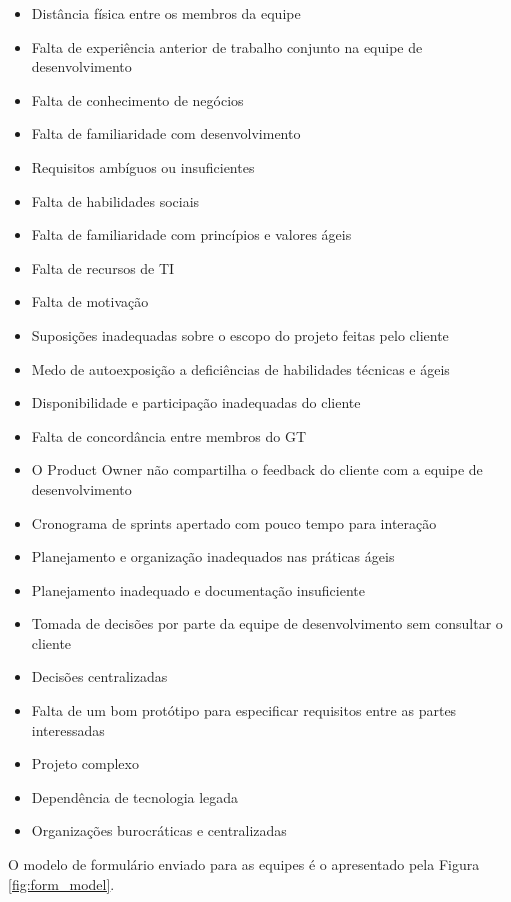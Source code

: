 \documentclass[
    12pt,       %
    openright,      %
    twoside,      %
    a4paper,      %
    english,      %
    french,       %
    spanish,      %
    brazil,       %
    ]{abntex2}
\begin{document}
\begin{itemize}
    \item Distância física entre os membros da equipe
    \item Falta de experiência anterior de trabalho conjunto na equipe de desenvolvimento
    \item Falta de conhecimento de negócios
    \item Falta de familiaridade com desenvolvimento
    \item Requisitos ambíguos ou insuficientes
    \item Falta de habilidades sociais
    \item Falta de familiaridade com princípios e valores ágeis
    \item Falta de recursos de TI
    \item Falta de motivação
    \item Suposições inadequadas sobre o escopo do projeto feitas pelo cliente
    \item Medo de autoexposição a deficiências de habilidades técnicas e ágeis
    \item Disponibilidade e participação inadequadas do cliente
    \item Falta de concordância entre membros do GT
    \item O Product Owner não compartilha o feedback do cliente com a equipe de desenvolvimento
    \item Cronograma de sprints apertado com pouco tempo para interação
    \item Planejamento e organização inadequados nas práticas ágeis
    \item Planejamento inadequado e documentação insuficiente
    \item Tomada de decisões por parte da equipe de desenvolvimento sem consultar o cliente
    \item Decisões centralizadas
    \item Falta de um bom protótipo para especificar requisitos entre as partes interessadas
    \item Projeto complexo
    \item Dependência de tecnologia legada
    \item Organizações burocráticas e centralizadas
\end{itemize}

O modelo de formulário enviado para as equipes é o apresentado pela Figura \ref{fig:form_model}.
\end{document}
